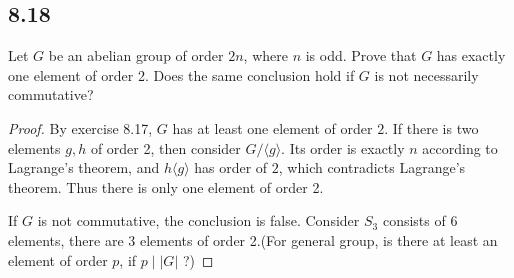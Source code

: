 \documentclass[a4paper, pdf, 12pt]{article}
\begin{document}
\subsection*{8.18}
Let $G$ be an abelian group of order $2n$, where $n$ is odd. Prove that $G$ has
exactly one element of order 2. Does the same conclusion hold if $G$ is not necessarily 
commutative?

\begin{proof}
  By exercise 8.17, $G$ has at least one element of order $2$. If there is two elements $g, h$ of order 2, then 
  consider $G/\langle g \rangle$. Its order is exactly $n$ according to Lagrange’s theorem, and $h\langle g \rangle$
  has order of $2$, which contradicts Lagrange’s theorem. Thus there is only one element of order 2.

  If $G$ is not commutative, the conclusion is false. Consider $S_{3}$ consists of 6 elements, there are 3 elements of 
  order 2.(For general group, is there at least an element of order $p$, if $p\mid \lvert G\rvert$ ?)
\end{proof}
\end{document}
